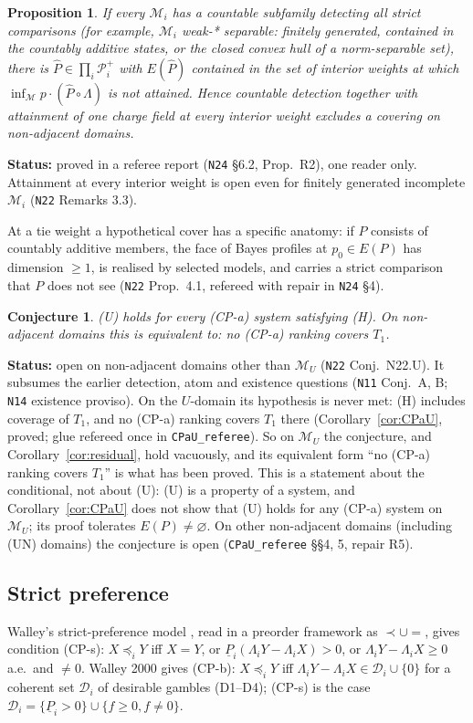 \documentclass[11pt]{article}
\newtheorem{proposition}[theorem]{Proposition}
\newtheorem{conjecture}[theorem]{Conjecture}
\theoremstyle{definition}
\theoremstyle{remark}
\newcommand{\M}{\mathcal M}
\newcommand{\lp}{\underline{P}}
\newcommand{\src}[1]{\texttt{#1}}
\newcommand{\status}[1]{\par\smallskip\noindent\textbf{Status:} #1\par\smallskip}
\begin{document}
\begin{proposition}\label{prop:CD}
If every $\M_i$ has a countable subfamily detecting all strict comparisons (for example, $\M_i$ weak-* separable: finitely generated, contained in the countably additive states, or the closed convex hull of a norm-separable set), there is $\hat P\in\prod_i\mathcal P^+_i$ with $E(\hat P)$ contained in the set of interior weights at which $\inf_\M p\cdot(\hat P\circ\Lambda)$ is not attained. Hence countable detection together with attainment of one charge field at every interior weight excludes a covering on non-adjacent domains.
\end{proposition}
\status{proved in a referee report (\src{N24} \S6.2, Prop.~R2), one reader only. Attainment at every interior weight is open even for finitely generated incomplete $\M_i$ (\src{N22} Remarks 3.3).}

At a tie weight a hypothetical cover has a specific anatomy: if $P$ consists of countably additive members, the face of Bayes profiles at $p_0\in E(P)$ has dimension $\ge1$, is realised by selected models, and carries a strict comparison that $P$ does not see (\src{N22} Prop.~4.1, refereed with repair in \src{N24} \S4).

\begin{conjecture}\label{conj:U}
(U) holds for every (CP-a) system satisfying (H). On non-adjacent domains this is equivalent to: no (CP-a) ranking covers $T_1$.
\end{conjecture}
\status{open on non-adjacent domains other than $\M_U$ (\src{N22} Conj.~N22.U). It subsumes the earlier detection, atom and existence questions (\src{N11} Conj.~A, B; \src{N14} existence proviso). On the $U$-domain its hypothesis is never met: (H) includes coverage of $T_1$, and no (CP-a) ranking covers $T_1$ there (Corollary~\ref{cor:CPaU}, proved; glue refereed once in \src{CPaU\_referee}). So on $\M_U$ the conjecture, and Corollary~\ref{cor:residual}, hold vacuously, and its equivalent form ``no (CP-a) ranking covers $T_1$'' is what has been proved. This is a statement about the conditional, not about (U): (U) is a property of a system, and Corollary~\ref{cor:CPaU} does not show that (U) holds for any (CP-a) system on $\M_U$; its proof tolerates $E(P)\ne\varnothing$. On other non-adjacent domains (including (UN) domains) the conjecture is open (\src{CPaU\_referee} \S\S4, 5, repair R5).}

\subsection{Strict preference}
Walley's strict-preference model \cite[\S\S3.7.7--3.7.9]{W1991}, read in a preorder framework as $\prec\cup{=}$, gives condition (CP-s): $X\preceq_iY$ iff $X=Y$, or $\lp_i(\Lambda_iY-\Lambda_iX)>0$, or $\Lambda_iY-\Lambda_iX\ge0$ a.e.\ and $\ne0$. Walley 2000 \cite[\S6]{W2000} gives (CP-b): $X\preceq_iY$ iff $\Lambda_iY-\Lambda_iX\in\mathcal D_i\cup\{0\}$ for a coherent set $\mathcal D_i$ of desirable gambles (D1--D4); (CP-s) is the case $\mathcal D_i=\{\lp_i>0\}\cup\{f\ge0,f\ne0\}$.
\end{document}
